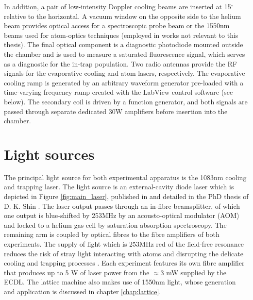 
	In addition, a pair of low-intensity Doppler cooling beams  are inserted at 15$^\circ$ relative to the horizontal. A vacuum window on the opposite side to the helium beam provides optical access for a spectroscopic probe beam or the 1550nm beams used for atom-optics techniques (employed in works not relevant to this thesis). The final optical component is a diagnostic photodiode mounted outside the chamber and is used to measure a saturated fluorescence signal, which serves as a diagnostic for the in-trap population. Two radio antennas provide the RF signals for the evaporative cooling and atom lasers, respectively. The evaporative cooling ramp is generated by an arbitrary waveform generator pre-loaded with a time-varying frequency ramp created with the LabView control software (see below). The secondary coil is driven by a function generator, and both signals are passed through separate dedicated 30W amplifiers before insertion into the chamber.



\section{Light sources}\label{ssec:lasers}
	
	The principal light source for both experimental apparatus is the 1083nm cooling and trapping laser. The light source is an external-cavity diode laser which is depicted in Figure \ref{fig:main_laser}, published in \cite{shin16} and detailed in the PhD thesis of D. K. Shin \cite{ShinThesis}. The laser output passes through an in-fibre beamsplitter, of which one output is blue-shifted by 253MHz by an acousto-optical modulator (AOM) and locked to a helium gas cell by saturation absorption spectroscopy. The remaining arm is coupled by optical fibres to the fibre amplifiers of both experiments. The supply of light which is 253MHz red of the field-free resonance reduces the risk of stray light interacting with atoms and disrupting the delicate cooling and trapping processes . Each experiment features its own fibre amplifier that produces up to 5 W of laser power from the $\approx$3 mW supplied by the ECDL. The lattice machine also makes use of 1550nm light, whose generation and application is discussed in chapter \ref{chap:lattice}.

